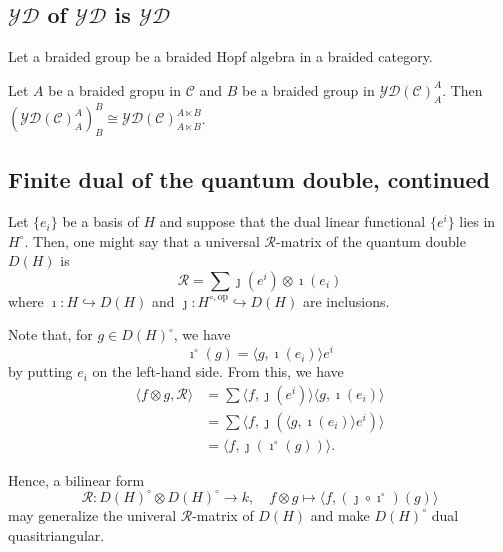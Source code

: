 
\subsection*{$\mathcal{YD}$ of $\mathcal{YD}$ is $\mathcal{YD}$}

Let a braided group be a braided Hopf algebra in a braided category.
\begin{proposition}
    Let $A$ be a braided gropu in $\mathcal{C}$ and $B$ be a braided group in $\mathcal{YD}(\mathcal{C})^A_A$.
    Then $(\mathcal{YD}(\mathcal{C})^A_A)^B_B \cong \mathcal{YD}(\mathcal{C})^{A \ltimes B}_{A \ltimes B}$.
\end{proposition}


\subsection*{Finite dual of the quantum double, continued}

Let $\{ e_i \}$ be a basis of $H$ and suppose that the dual linear functional $\{ e^i \}$ lies in $H^\circ$.
Then, one might say that a universal $\mathcal{R}$-matrix of the quantum double $D(H)$ is
\[
\mathcal{R} = \sum \jmath(e^i) \otimes \imath(e_i)
\]
where $\imath: H \hookrightarrow D(H)$ and $\jmath: H^{\circ, \text{op}} \hookrightarrow D(H)$ are inclusions.

Note that, for $g \in D(H)^\circ$, we have
\[
\imath^\circ(g) = \langle g, \imath(e_i) \rangle e^i
\]
by putting $e_i$ on the left-hand side.
From this, we have
\begin{align*}
\langle f \otimes g, \mathcal{R} \rangle & = \sum \langle f, \jmath(e^i)\rangle \langle g, \imath(e_i) \rangle \\
& = \sum \langle f, \jmath \left( \langle g, \imath(e_i) \rangle e^i \right) \rangle \\
& = \langle f, \jmath \left( \imath^\circ (g) \right) \rangle.
\end{align*}

Hence, a bilinear form
\[
\mathcal{R}: D(H)^\circ \otimes D(H)^\circ \rightarrow k, \quad f \otimes g \mapsto \langle f, (\jmath \circ \imath^\circ)(g) \rangle
\]
may generalize the univeral $\mathcal{R}$-matrix of $D(H)$ and make $D(H)^\circ$ dual quasitriangular.